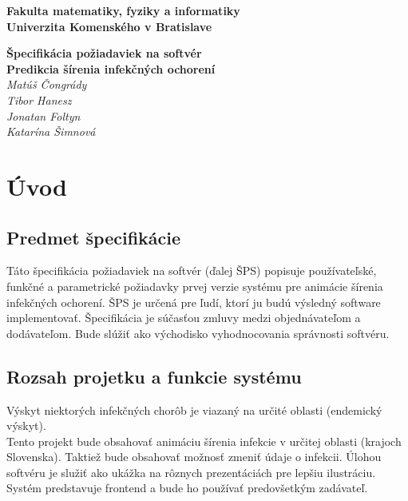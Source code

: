 \documentclass[12pt,a4paper]{report}
\begin{document}
\begin{titlepage}
\centering\bfseries
		Fakulta matematiky, fyziky a informatiky\\Univerzita Komenského v Bratislave	

	\fontsize{23}{28}\textbf{Špecifikácia požiadaviek na softvér}\\
	\fontsize{16}{22}\textbf{Predikcia šírenia infekčných ochorení}\\
	\large\textit{Matúš Čongrády\\Tibor Hanesz\\Jonatan Foltyn\\Katarína Šimnová}

\end{titlepage}\bigskip
	\setcounter{tocdepth}{9}
	\tableofcontents
	
\renewcommand{\chaptername}{}	
	\chapter[Úvod]{\rmfamily\bfseries
Úvod}


\section[Predmet špecifikácie]{\rmfamily\bfseries
	Predmet špecifikácie}
Táto špecifikácia požiadaviek na softvér (ďalej ŠPS) popisuje používateľské, funkčné a parametrické požiadavky prvej verzie systému pre animácie šírenia infekčných ochorení. ŠPS je určená pre ľudí, ktorí ju budú výsledný software implementovať. Špecifikácia je súčasťou zmluvy medzi objednávateľom a dodávateľom. Bude slúžiť ako východisko vyhodnocovania správnosti softvéru.

\section[Rozsah projetku a funkcie systému]{\rmfamily\bfseries
Rozsah projetku a funkcie systému}
Výskyt niektorých infekčných chorôb je viazaný na určité oblasti (endemický výskyt). \\
Tento projekt bude obsahovať animáciu šírenia infekcie v určitej oblasti (krajoch Slovenska). Taktiež bude obsahovať možnosť zmeniť údaje o infekcii. Úlohou softvéru je služiť ako ukážka na rôznych prezentáciách pre lepšiu ilustráciu. Systém predstavuje frontend a bude ho používať predovšetkým zadávateľ. 
\end{document}
